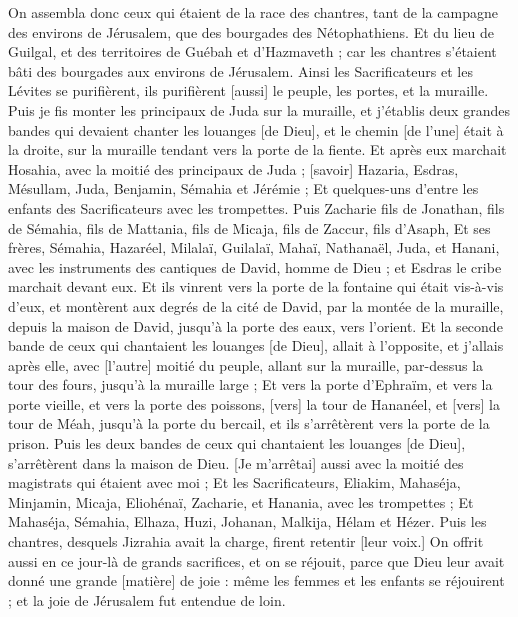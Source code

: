 \begin{multicols}{2}
On assembla donc ceux qui étaient de la race des chantres, tant de la campagne des environs de Jérusalem, que des bourgades des Nétophathiens.
Et du lieu de Guilgal, et des territoires de Guébah et d'Hazmaveth ; car les chantres s'étaient bâti des bourgades aux environs de Jérusalem.
Ainsi les Sacrificateurs et les Lévites se purifièrent, ils purifièrent [aussi] le peuple, les portes, et la muraille.
Puis je fis monter les principaux de Juda sur la muraille, et j'établis deux grandes bandes qui devaient chanter les louanges [de Dieu], et le chemin [de l'une] était à la droite, sur la muraille tendant vers la porte de la fiente.
Et après eux marchait Hosahia, avec la moitié des principaux de Juda ;
[savoir] Hazaria, Esdras, Mésullam,
Juda, Benjamin, Sémahia et Jérémie ;
Et quelques-uns d'entre les enfants des Sacrificateurs avec les trompettes. Puis Zacharie fils de Jonathan, fils de Sémahia, fils de Mattania, fils de Micaja, fils de Zaccur, fils d'Asaph,
Et ses frères, Sémahia, Hazaréel, Milalaï, Guilalaï, Mahaï, Nathanaël, Juda, et Hanani, avec les instruments des cantiques de David, homme de Dieu ; et Esdras le cribe marchait devant eux.
Et ils vinrent vers la porte de la fontaine qui était vis-à-vis d'eux, et montèrent aux degrés de la cité de David, par la montée de la muraille, depuis la maison de David, jusqu'à la porte des eaux, vers l'orient.
Et la seconde bande de ceux qui chantaient les louanges [de Dieu], allait à l'opposite, et j'allais après elle, avec [l'autre] moitié du peuple, allant sur la muraille, par-dessus la tour des fours, jusqu'à la muraille large ;
Et vers la porte d'Ephraïm, et vers la porte vieille, et vers la porte des poissons, [vers] la tour de Hananéel, et [vers] la tour de Méah, jusqu'à la porte du bercail, et ils s'arrêtèrent vers la porte de la prison.
Puis les deux bandes de ceux qui chantaient les louanges [de Dieu], s'arrêtèrent dans la maison de Dieu. [Je m'arrêtai] aussi avec la moitié des magistrats qui étaient avec moi ;
Et les Sacrificateurs, Eliakim, Mahaséja, Minjamin, Micaja, Eliohénaï, Zacharie, et Hanania, avec les trompettes ;
Et Mahaséja, Sémahia, Elhaza, Huzi, Johanan, Malkija, Hélam et Hézer. Puis les chantres, desquels Jizrahia avait la charge, firent retentir [leur voix.]
On offrit aussi en ce jour-là de grands sacrifices, et on se réjouit, parce que Dieu leur avait donné une grande [matière] de joie : même les femmes et les enfants se réjouirent ; et la joie de Jérusalem fut entendue de loin.

\end{multicols}
